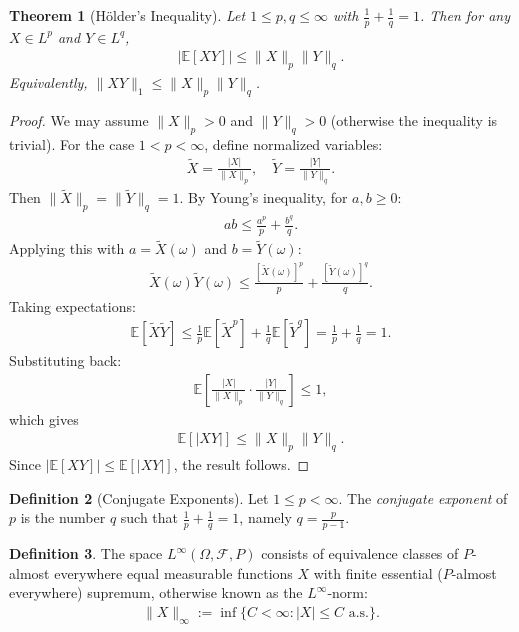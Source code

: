 \documentclass[11pt,reqno]{amsart}
\newtheorem{theorem}{Theorem}[section]
\theoremstyle{definition}
\newtheorem{definition}[theorem]{Definition}
\theoremstyle{remark}
\begin{document}
\begin{theorem}[Hölder's Inequality]
	Let $1 \leq p, q \leq \infty$ with $\frac{1}{p} + \frac{1}{q} = 1$. Then for any $X \in L^p$ and $Y \in L^q$,
	\begin{align*}
		|\mathbb{E}[XY]| \leq \|X\|_p \|Y\|_q.
	\end{align*}
	Equivalently, $\|XY\|_1 \leq \|X\|_p \|Y\|_q$.
\end{theorem}

\begin{proof}
	We may assume $\|X\|_p > 0$ and $\|Y\|_q > 0$ (otherwise the inequality is trivial). For the case $1 < p < \infty$, define normalized variables:
	\begin{align*}
		\tilde{X} = \frac{|X|}{\|X\|_p}, \quad \tilde{Y} = \frac{|Y|}{\|Y\|_q}.
	\end{align*}
	Then $\|\tilde{X}\|_p = \|\tilde{Y}\|_q = 1$. By Young's inequality, for $a, b \geq 0$:
	\begin{align*}
		ab \leq \frac{a^p}{p} + \frac{b^q}{q}.
	\end{align*}
	Applying this with $a = \tilde{X}(\omega)$ and $b = \tilde{Y}(\omega)$:
	\begin{align*}
		\tilde{X}(\omega) \tilde{Y}(\omega) \leq \frac{[\tilde{X}(\omega)]^p}{p} + \frac{[\tilde{Y}(\omega)]^q}{q}.
	\end{align*}
	Taking expectations:
	\begin{align*}
		\mathbb{E}[\tilde{X} \tilde{Y}] \leq \frac{1}{p}\mathbb{E}[\tilde{X}^p] + \frac{1}{q}\mathbb{E}[\tilde{Y}^q] = \frac{1}{p} + \frac{1}{q} = 1.
	\end{align*}
	Substituting back:
	\begin{align*}
		\mathbb{E}\left[\frac{|X|}{\|X\|_p} \cdot \frac{|Y|}{\|Y\|_q}\right] \leq 1,
	\end{align*}
	which gives
	\begin{align*}
		\mathbb{E}[|XY|] \leq \|X\|_p \|Y\|_q.
	\end{align*}
	Since $|\mathbb{E}[XY]| \leq \mathbb{E}[|XY|]$, the result follows.
\end{proof}

\begin{definition}[Conjugate Exponents]
	Let $1 \leq p < \infty$. The \emph{conjugate exponent} of $p$ is the number $q$ such that $\frac{1}{p} + \frac{1}{q} = 1$, namely $q = \frac{p}{p-1}$.
\end{definition}

\begin{definition}
	The space \(L^\infty(\Omega, \mathcal{F}, P)\) consists of equivalence classes of \(P\)-almost everywhere equal measurable functions $X$ with finite essential (\(P\)-almost everywhere) supremum, otherwise known as the \(L^\infty\)-norm:
	\begin{align*}
		\|X\|_\infty := \inf \{C < \infty : |X| \leq C \text{ a.s.}\}.
	\end{align*}
\end{definition}
\end{document}
